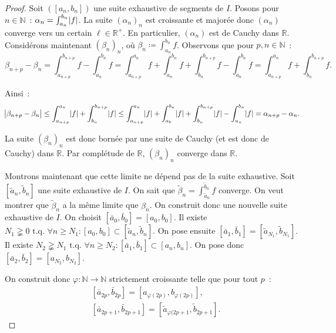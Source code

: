 \documentclass{report}
\theoremstyle{definition}
\theoremstyle{remark}
\numberwithin{equation}{section}
\newcommand{\R}{\mathbb R}
\newcommand{\Rp}{\R^{+}}
\newcommand{\N}{\mathbb N}
\newcommand{\tq}{\text{ t.q. }}
\begin{document}
			\begin{proof} Soit $([a_n, b_n])$ une suite exhaustive de segments de $I$. Posons pour $n \in \N$~: $\alpha_n = \int_{a_n}^{b_n}\abs f$.
			La suite $(\alpha_n)_n$ est croissante et majorée donc $(\alpha_n)$ converge vers un certain $\ell \in \Rp$. En particulier, $(\alpha_n)$ est de
			Cauchy dans $\R$. Considérons maintenant $(\beta_n)_n$, où $\beta_n \coloneqq \int_{a_n}^{b_n}f$. Observons que pour $p, n \in \N$~:
			\begin{equation}
				\beta_{n+p} - \beta_n = \int_{a_{n+p}}^{b_{n+p}}f - \int_{a_n}^{b_n}f
				= \int_{a_{n+p}}^{a_n}f + \int_{a_n}^{b_n}f + \int_{b_n}^{b_{n+p}}f - \int_{a_n}^{b_n}f = \int_{a_{n+p}}^{a_n}f + \int_{b_n}^{b_{n+p}}f.
			\end{equation}

			Ainsi~:
			\begin{equation}
				\abs {\beta_{n+p}-\beta_n} \leq \int_{a_{n+p}}^{a_n}\abs f + \int_{b_n}^{b_{n+p}} \abs f
				\leq \int_{a_{n+p}}^{a_n}\abs f + \int_{a_b}^{b_n} \abs f + \int_{b_n}^{b_{n+p}} \abs f - \int_{a_n}^{b_n}\abs f
				= \alpha_{n+p} - \alpha_n.
			\end{equation}

			La suite $(\beta_n)_n$ est donc bornée par une suite de Cauchy (et est donc de Cauchy) dans $\R$. Par complétude de $\R$, $(\beta_n)_n$ converge
			dans $\R$.

			Montrons maintenant que cette limite ne dépend pas de la suite exhaustive. Soit $[\widetilde a_n, \widetilde b_n]$ une suite exhaustive de $I$. On
			sait que $\widetilde \beta_n = \int_{\widetilde a_n}^{\widetilde b_n} f$ converge. On veut montrer que $\widetilde \beta_n$ a la même limite que
			$\beta_n$. On construit donc une nouvelle suite exhaustive de $I$. On choisit $[\bar a_0, \bar b_0] = [a_0, b_0]$. Il existe
			$N_1 \gneqq 0 \tq \forall n \geq N_1 : [a_0, b_0] \subset [\widetilde a_n, \widetilde b_n]$. On pose ensuite
			$[\bar a_1, \bar b_1] = [\widetilde a_{N_1}, \widetilde b_{N_1}]$. Il existe
			$N_2 \gneqq N_1 \tq \forall n \geq N_2 : [\bar a_1, \bar b_1] \subset [a_n, b_n]$. On pose donc $[\bar a_2, \bar b_2] = [a_{N_2}, b_{N_2}]$.

			On construit donc $\varphi : \N \to \N$ strictement croissante telle que pour tout $p$~:
			\begin{align}
				&[\bar a_{2p}, \bar b_{2p}] = [a_{\varphi(2p)}, b_{\varphi(2p)}], \\
				&[\bar a_{2p+1}, \bar b_{2p+1}] = [\widetilde a_{\varphi(2p+1}, \widetilde b_{2p+1}].
			\end{align}


\end{proof}
\end{document}
